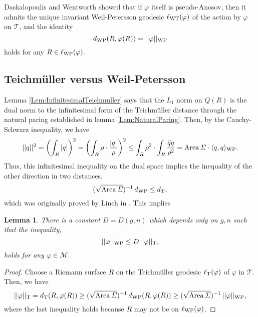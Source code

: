 \documentclass[11pt,reqno]{amsart}
\newtheorem{lemma}[theorem]{{\bf Lemma}}
\numberwithin{equation}{section}
\begin{document}
Daskalopoulis and Wentworth \cite{DW} 
showed that if  $\varphi$  itself is pseudo-Anosov, 
then it admits the unique invariant Weil-Petersson geodesic  $\ell_{{\rm WT}}(\varphi)$  
of the action by  $\varphi$   on  $\mathcal{T}$,  
and the identity 
\begin{equation*}
	d_{\rm WP} (R, \varphi(R)) =  || \varphi ||_{\rm WP} 
\end{equation*} 
holds for any  $R \in \ell_{{\rm WP}}(\varphi)$.   

\subsection{Teichm\"uller versus Weil-Petersson}

Lemma \ref{Lem:InfinitesimalTeichmuller} says that 
the $L_1$ norm on  $Q(R)$  is the dual norm to the infinitesimal form 
of the Teichm\"uller distance through the natural paring 
established in lemma \ref{Lem:NaturalParing}.  
Then, 
by the Cauchy-Schwarz inequality, 
we have 
\begin{equation*}
	|| q ||^2 
	= \left( \int_R |q| \right)^2 
	= \left( \int_R \rho \cdot \frac{|q|}{\rho} \right)^2 
	\leq \int_R \rho^2 \cdot \int_R \frac{\bar{q} q}{\rho^2} 
	= {\rm Area} \, \varSigma \cdot \langle q, q \rangle_{{\rm WP}}.  
\end{equation*}
Thus, 
this infinitesimal inequality on the dual space implies the inequality 
of the other direction in two distances,  
\begin{equation*}
	(\sqrt{{\rm Area} \, \varSigma})^{-1} \, d_{{\rm WP}} \leq d_{{\rm T}}, 
\end{equation*} 
which was originally proved by Linch in \cite{Linch}. 
This implies 

\begin{lemma}\label{Lem:WPleqT}
	There is a constant  $D = D(g, n)$  which depends only on  $g, n$  such that the inequality, 
	\begin{equation}\label{Eq:WPleqT}
	|| \varphi ||_{{\rm WP}} \leq  D \, || \varphi ||_{{\rm T}},  	
	\end{equation} 
	holds for any  $\varphi \in \mathcal{M}$.  
\end{lemma}
\begin{proof} 
Choose a Riemann surface  $R$  on the Teichm\"uller  geodesic  
$\ell_{{\rm T}}(\varphi)$  of  $\varphi$  in  $\mathcal{T}$.  
Then, 
we have 
\begin{equation*}
	|| \varphi ||_{{\rm T}} 
	= d_{{\rm T}}(R, \varphi(R)) 
	\geq (\sqrt{{\rm Area} \, \varSigma})^{-1} \, d_{{\rm WP}}(R, \varphi(R)) 
	\geq (\sqrt{{\rm Area} \, \varSigma})^{-1} \, || \varphi ||_{{\rm WP}},  
\end{equation*}
where the last inequality holds because   
$R$  may not be on  $\ell_{{\rm WP}}(\varphi)$.   
\end{proof}
\end{document}

